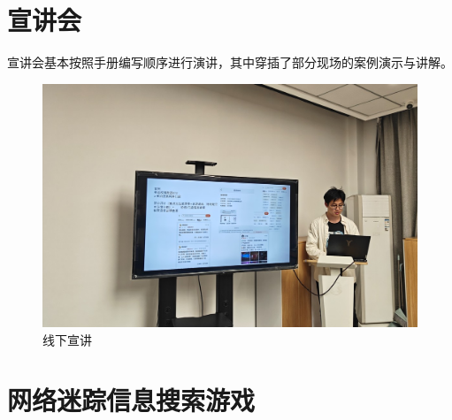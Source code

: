 \section{宣讲会}
宣讲会基本按照手册编写顺序进行演讲，其中穿插了部分现场的案例演示与讲解。
\begin{figure}
    \centering
    \includegraphics[width=.5\textwidth]{./figures/线下.jpg}
    \caption{线下宣讲}
\end{figure}
\section{网络迷踪信息搜索游戏}
